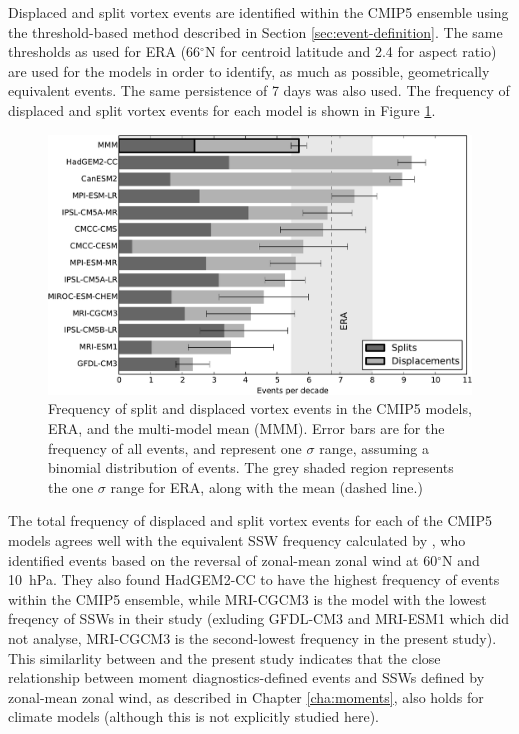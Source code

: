 Displaced and split vortex events are identified within the CMIP5 ensemble using
the threshold-based method described in Section \ref{sec:event-definition}. The
same thresholds as used for ERA (66$^{\circ}$N for centroid latitude and 2.4 for
aspect ratio) are used for the models in order to identify, as much as possible,
geometrically equivalent events. The same persistence of 7 days was also used.
The frequency of displaced and split vortex events for each model is shown in
Figure \ref{fig:cmip5_events_bar_stacked}.

\begin{figure}[htbp]
 \centering
 \noindent\includegraphics[width=\textwidth]{figures/chapter-models/events_bar_stacked.pdf}
 \caption[Frequency of split and displaced vortex events in the CMIP5
 models]{Frequency of split and displaced vortex events in the CMIP5 models,
   ERA, and the multi-model mean (MMM). Error bars are for the frequency of all
   events, and represent one $\sigma$ range, assuming a binomial distribution of
   events. The grey shaded region represents the one $\sigma$ range for ERA,
   along with the mean (dashed line.) }
 \label{fig:cmip5_events_bar_stacked}
\end{figure}

The total frequency of displaced and split vortex events for each of the CMIP5
models agrees well with the equivalent SSW frequency calculated by
\citet{Charlton-Perez2013}, who identified events based on the reversal of
zonal-mean zonal wind at 60$^{\circ}$N and 10~hPa. They also found HadGEM2-CC to
have the highest frequency of events within the CMIP5 ensemble, while MRI-CGCM3
is the model with the lowest freqency of SSWs in their study (exluding GFDL-CM3
and MRI-ESM1 which \citet{Charlton-Perez2013} did not analyse, MRI-CGCM3 is the
second-lowest frequency in the present study). This similarlity between
\citet{Charlton-Perez2013} and the present study indicates that the close
relationship between moment diagnostics-defined events and SSWs defined by
zonal-mean zonal wind, as described in Chapter \ref{cha:moments}, also holds for
climate models (although this is not explicitly studied here).

